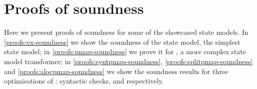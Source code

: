 \chapter{Proofs of soundness}

Here we present proofs of soundness for some of the showcased state models. In \cref{proofs:ex-soundness} we show the soundness of the \Ex{} state model, the simplest state model; in \cref{proofs:pmap-soundness} we prove it for \PMap{}, a more complex state model transformer; in \cref{proofs:syntpmap-soundness}, \cref{proofs:splitpmap-soundness} and \cref{proofs:alocpmap-soundness} we show the soundness results for three optimisations of \PMap: syntactic checks, \SplitPMap{} and \ALocPMap{} respectively.





